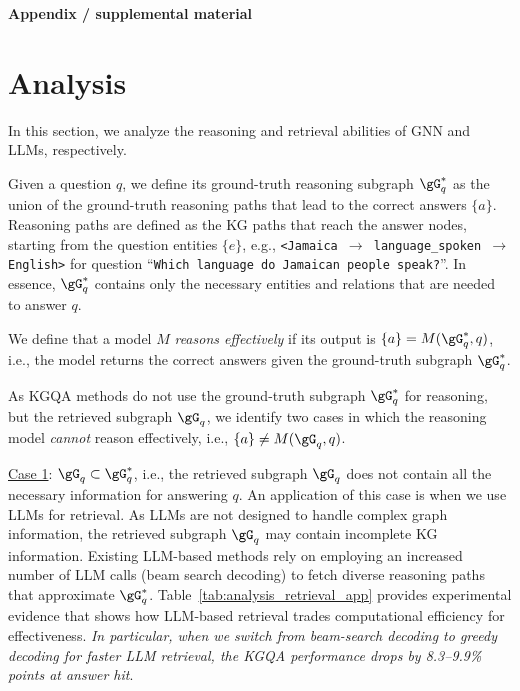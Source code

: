 \newpage
\appendix

\textbf{\Large Appendix / supplemental material}


\section{Analysis} \label{app:analysis}



In this section, we analyze the reasoning and retrieval abilities of GNN and LLMs, respectively.

\begin{definition} \label{def:1}
Given a question $q$, we define its ground-truth reasoning subgraph $\gG_q^\ast$ as the union of the ground-truth reasoning paths that lead to the correct answers $\{a\}$. Reasoning paths are defined as the KG paths that reach the answer nodes, starting from the question entities $\{e\}$, e.g., \texttt{<Jamaica $\rightarrow$ language\_spoken $\rightarrow$ English>} for question ``\texttt{Which language do Jamaican people speak?}''. In essence, $\gG_q^\ast$ contains only the necessary entities and relations that are needed to answer $q$. 
\end{definition}

\begin{definition}\label{def:1a}
We define that a model $M$ \emph{reasons effectively}  if its output is $\{a\} = M(\gG_q^\ast, q)$, i.e., the model returns the correct answers given the ground-truth subgraph $\gG_q^\ast$.
\end{definition}

As KGQA methods do not use the ground-truth subgraph $\gG_q^\ast$ for reasoning, but the retrieved subgraph $\gG_q$, we identify two cases in which the reasoning model \emph{cannot} reason effectively, i.e., $\{a\} \neq M(\gG_q, q)$.

\underline{Case 1}: $\gG_q \subset \gG_q^\ast $, i.e., the retrieved subgraph $\gG_q$ does not contain all the necessary information for answering $q$. An application of this case is when we use LLMs for retrieval. As LLMs are not designed to handle complex graph information, the retrieved subgraph $\gG_q$ may contain incomplete KG information. Existing LLM-based methods rely on employing an increased number of LLM calls (beam search decoding) to fetch diverse reasoning paths that approximate $\gG_q^\ast$. Table~\ref{tab:analysis_retrieval_app} provides experimental evidence  that shows how LLM-based retrieval trades computational efficiency for effectiveness. \emph{In particular, when we switch from beam-search decoding to greedy decoding for faster LLM retrieval, the KGQA performance drops by  8.3--9.9\% points at answer hit}.


